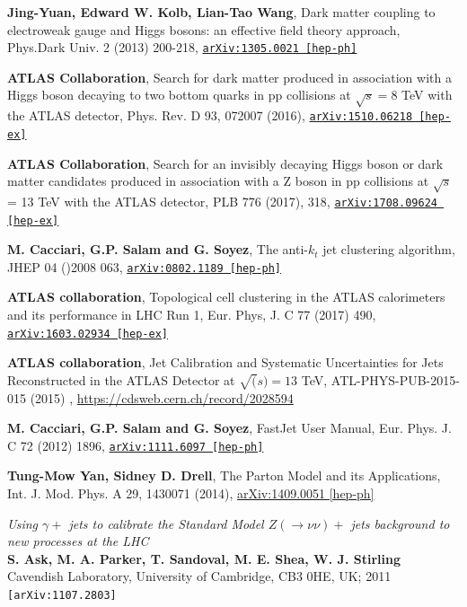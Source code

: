 \documentclass[11pt,a4paper,openright,twoside]{report}
\begin{document}
\begin{thebibliography}{9}
\textbf{Jing-Yuan, Edward W. Kolb, Lian-Tao Wang}, Dark matter coupling to electroweak gauge and Higgs bosons: an effective field theory approach, Phys.Dark Univ. 2 (2013) 200-218, \href{https://arxiv.org/abs/1305.0021}{\texttt{arXiv:1305.0021 [hep-ph]}}

\textbf{ATLAS Collaboration}, Search for dark matter produced in association with a Higgs boson decaying to two bottom quarks in pp collisions at $\sqrt{s} = 8$ TeV with the ATLAS detector, Phys. Rev. D 93, 072007 (2016), \href{https://arxiv.org/abs/1510.06218}{\texttt{arXiv:1510.06218 [hep-ex]}}

	\textbf{ATLAS Collaboration}, Search for an invisibly decaying Higgs boson or dark matter candidates produced in association with a Z boson in pp collisions at $\sqrt{s}$ = 13 TeV with the ATLAS detector, PLB 776 (2017), 318, \href{https://arxiv.org/abs/1708.09624}{\texttt{arXiv:1708.09624 [hep-ex]}}
	
	\textbf{M. Cacciari, G.P. Salam and G. Soyez}, The anti-$k_t$ jet clustering algorithm, JHEP 04 ()2008 063, \href{https://arxiv.org/abs/0802.1189}{\texttt{arXiv:0802.1189 [hep-ph]}}
	
	\textbf{ATLAS collaboration}, Topological cell clustering in the ATLAS calorimeters and its performance in LHC Run 1, Eur. Phys, J. C 77 (2017) 490, \href{https://arxiv.org/abs/1603.02934}{\texttt{arXiv:1603.02934 [hep-ex]}}
	
	\textbf{ATLAS collaboration}, Jet Calibration and Systematic Uncertainties for Jets Reconstructed in the ATLAS Detector at $\sqrt(s)=13$ TeV, ATL-PHYS-PUB-2015-015 (2015) , \url{https://cdsweb.cern.ch/record/2028594}
	
	\textbf{M. Cacciari, G.P. Salam and G. Soyez}, FastJet User Manual, Eur. Phys. J. C 72 (2012) 1896, \href{https://arxiv.org/abs/1111.6097}{\texttt{arXiv:1111.6097 [hep-ph]}}
	
	\textbf{Tung-Mow Yan, Sidney D. Drell}, The Parton Model and its Applications, Int. J. Mod. Phys. A 29, 1430071 (2014),  \href{https://arxiv.org/abs/1409.0051}{arXiv:1409.0051 [hep-ph]}
	
	\textit{Using $\gamma +$ jets to calibrate the Standard Model $Z(\rightarrow \nu\nu)+$ jets background to new processes at the LHC}\\
	\textbf{S. Ask, M. A. Parker, T. Sandoval, M. E. Shea, W. J. Stirling}\\
Cavendish Laboratory, University of Cambridge, CB3 0HE, UK; 2011\\
	\texttt{[arXiv:1107.2803]}


\end{thebibliography}
\end{document}

